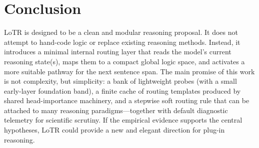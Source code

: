 \documentclass[11pt]{article}
\begin{document}
\section{Conclusion}

LoTR is designed to be a clean and modular reasoning proposal. It does not attempt to hand-code logic or replace existing reasoning methods. Instead, it introduces a minimal internal routing layer that reads the model's current reasoning state(s), maps them to a compact global logic space, and activates a more suitable pathway for the next sentence span. The main promise of this work is not complexity, but simplicity: a bank of lightweight probes (with a small early-layer foundation band), a finite cache of routing templates produced by shared head-importance machinery, and a stepwise soft routing rule that can be attached to many reasoning paradigms---together with default diagnostic telemetry for scientific scrutiny. If the empirical evidence supports the central hypotheses, LoTR could provide a new and elegant direction for plug-in reasoning.
\end{document}
